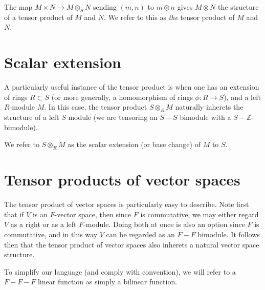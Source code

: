\documentclass[12pt]{report}
\theoremstyle{plain}
\newcommand{\ZZ}{\mathbb{Z}}
\begin{document}
The map $M \times N \to M \otimes_S N$ sending $(m, n)$ to $m \otimes n$
gives $M \otimes N$ the structure of a tensor product of $M$ and $N$. We
refer to this as \textit{the} tensor product of $M$ and $N$.

\section{Scalar extension}

A particularly useful instance of the tensor product is when one has an
extension of rings $R \subset S$ (or more generally, a homomorphism of
rings $\phi : R \to S$), and a left $R$-module $M$. In this case, the
tensor product $S \otimes_R M$ naturally inherets the structure of a left
$S$ module (we are tensoring an $S-S$ bimodule with a $S-\ZZ$-bimodule).

We refer to $S \otimes_R M$ as the scalar extension (or base change) of $M$
to $S$.

\section{Tensor products of vector spaces}

The tensor product of vector spaces is particularly easy to describe. Note
first that if $V$ is an $F$-vector space, then since $F$ is commutative, we
may either regard $V$ as a right or as a left $F$-module. Doing both at
once is also an option since $F$ is commutative, and in this way $V$ can be
regarded as an $F-F$ bimodule. It follows then that the tensor product of
vector spaces also inherets a natural vector space structure.

To simplify our language (and comply with convention), we will refer to a
$F-F-F$ linear function as simply a bilinear function.
\end{document}
